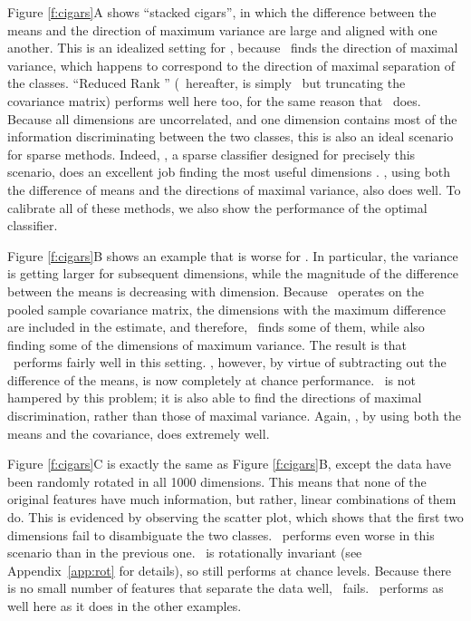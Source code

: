 \documentclass[11pt]{extarticle}
\begin{document}
Figure \ref{f:cigars}{\color{magenta}A} shows   ``stacked cigars'',  in which the difference between the means and  the direction of maximum variance are  large  and aligned with one another.
This is an idealized setting for \Pca, because \Pca~finds the direction of maximal variance, which happens to correspond to the direction of maximal separation of the classes.
``Reduced Rank \Lda'' \cite{Hastie1996}  (\Lda~hereafter, is simply \Lda~but truncating the covariance matrix) performs well here too, for the same reason that \Pca~does.
Because all dimensions are uncorrelated, and one dimension contains most of the information discriminating between the two classes, this is also an ideal scenario for sparse methods.
Indeed,  \Road, a sparse classifier designed for precisely this scenario,  does an excellent job finding the most useful dimensions \cite{Fan2012a}.
\Lol, using both the difference of means and the directions of maximal variance, also does well.
To calibrate all of these methods, we also show the performance of the optimal classifier.


Figure \ref{f:cigars}{\color{magenta}B} shows an example that is worse for  \Pca.
In particular, the variance is getting larger for subsequent dimensions,
while the magnitude of the difference between the means is decreasing with dimension.
Because \Pca~operates on the pooled sample covariance matrix, the dimensions with the maximum difference are included in the estimate, and therefore, \Pca~finds some of them, while also finding some of the dimensions of maximum variance.  The result is that \Pca~performs fairly well in this setting.
\Lda, however, by virtue of subtracting out the difference of the means, is now completely at chance performance.
\Road~is not hampered by this problem; it is also able to find the directions of maximal discrimination, rather than those of maximal variance.
Again, \Lol, by using both the means and the covariance, does extremely well.


Figure \ref{f:cigars}{\color{magenta}C}  is exactly the same as Figure \ref{f:cigars}{\color{magenta}B}, except the data have been randomly rotated in all 1000 dimensions.  This means that none of the original features have much information, but rather, linear combinations of them do.
This is evidenced by observing the scatter plot, which shows that the first two dimensions  fail to disambiguate the two classes.
\Pca~performs even worse in this scenario than in the previous one.
\Lda~is rotationally invariant (see Appendix~\ref{app:rot}  for details),  so still performs at chance levels.
Because there is no small number of features that separate the data well,  \Road~fails.
 \Lol~performs  as well here as it does in the other examples.
\end{document}
